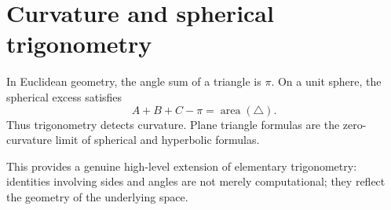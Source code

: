 \section{Curvature and spherical trigonometry}

In Euclidean geometry, the angle sum of a triangle is $\pi$.  On a unit sphere, the spherical excess satisfies
\[
  A+B+C-\pi=\operatorname{area}(\triangle).
\]
Thus trigonometry detects curvature.  Plane triangle formulas are the zero-curvature limit of spherical and hyperbolic formulas.

This provides a genuine high-level extension of elementary trigonometry: identities involving sides and angles are not merely computational; they reflect the geometry of the underlying space.
